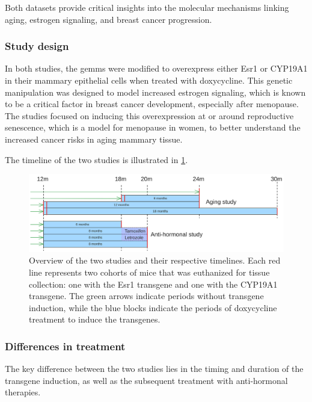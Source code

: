 Both datasets provide critical insights into the molecular mechanisms linking
aging, estrogen signaling, and breast cancer progression.

\subsubsection{Study design}

In both studies, the \glspl{gemm} were modified to overexpress either Esr1 or
CYP19A1 in their mammary epithelial cells when treated with doxycycline.
This genetic manipulation was designed to model increased estrogen signaling,
which is known to be a critical factor in breast cancer development, especially
after menopause\supercite{furth_esr1_2023,furth_overexpression_2023}.
The studies focused on inducing this overexpression at or around reproductive
senescence, which is a model for menopause in women, to better understand the
increased cancer risks in aging mammary
tissue\supercite{furth_esr1_2023,furth_overexpression_2023}.

The timeline of the two studies is illustrated in \cref{fig:dataset_timeline}.

\begin{figure}[ht]
    \centering

    \includegraphics[width=\textwidth]{chapters/3_materials_and_methods/figures/datasets.png}
    \caption{Overview of the two studies and their respective timelines.
        Each red line represents two cohorts of mice that was euthanized for tissue
        collection: one with the Esr1 transgene and one with the CYP19A1 transgene.
        The green arrows indicate periods without transgene induction, while the blue
        blocks indicate the periods of doxycycline treatment to induce the transgenes.
    } \label{fig:dataset_timeline} \end{figure}

\subsubsection{Differences in treatment}
The key difference between the two studies lies in the timing and duration of
the transgene induction, as well as the subsequent treatment with anti-hormonal
therapies.

